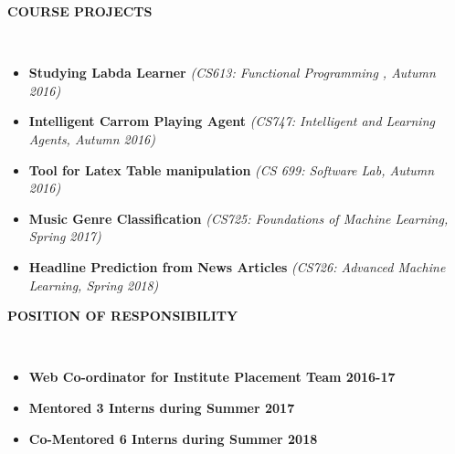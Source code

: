 \documentclass[a4paper,10pt]{article}
\newcommand{\lsep}{-0.5cm}
\newcommand{\resheading}[1]{{\small \colorbox{mygrey}{\begin{minipage}{0.975\textwidth}{\textbf{#1 \vphantom{p\^{E}}}}\end{minipage} \hspace{0.2cm}}}}
\begin{document}
\resheading{\textbf{COURSE PROJECTS} }\\[\lsep]
\begin{itemize}[leftmargin=1.25cm]
	\item \textbf{Studying Labda Learner} \hfill\emph{(CS613: Functional Programming , Autumn 2016)}\\[-0.4cm]
	
	\item \textbf{Intelligent Carrom Playing Agent} \hfill\emph{(CS747: Intelligent and Learning Agents, Autumn 2016)}\\[-0.4cm]
	
	\item \textbf{Tool for Latex Table manipulation} \hfill\emph{(CS 699: Software Lab, Autumn 2016)}\\[-0.4cm]

	\item \textbf{Music Genre Classification} \hfill\emph{(CS725: Foundations of Machine Learning, Spring 2017)}\\[-0.4cm]

	\item \textbf{Headline Prediction from News Articles} \hfill\emph{(CS726: Advanced Machine Learning, Spring 2018)}\\[-0.4cm]

\end{itemize}



 

	


\resheading{\textbf{POSITION OF RESPONSIBILITY} }\\[\lsep]
\begin{itemize} [leftmargin=1.25cm]
	\item \noindent \textbf{Web Co-ordinator for Institute Placement Team 2016-17} \\[-0.4cm]
	\item \noindent \textbf{Mentored 3 Interns during Summer 2017} \\[-0.4cm]	
	\item \noindent \textbf{Co-Mentored 6 Interns during Summer 2018} \\[-0.4cm]		


\end{itemize}
\end{document}
